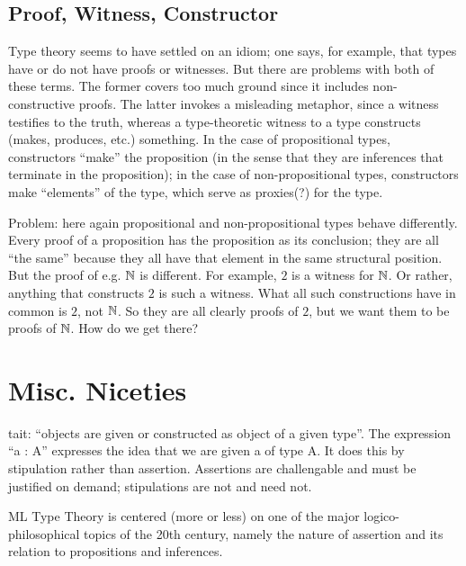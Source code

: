 \subsection{Proof, Witness, Constructor}
\label{subs:pwc}

Type theory seems to have settled on an idiom; one says, for example,
that types have or do not have proofs or witnesses.  But there are
problems with both of these terms.  The former covers too much ground
since it includes non-constructive proofs.  The latter invokes a
misleading metaphor, since a witness testifies to the truth, whereas a
type-theoretic witness to a type constructs (makes, produces, etc.)
something.  In the case of propositional types, constructors ``make''
the proposition (in the sense that they are inferences that terminate
in the proposition); in the case of non-propositional types,
constructors make ``elements'' of the type, which serve as proxies(?) for
the type.

\begin{remark}
  Problem: here again propositional and non-propositional types behave
  differently.  Every proof of a proposition has the proposition as
  its conclusion; they are all ``the same'' because they all have that
  element in the same structural position.  But the proof of
  e.g. \(\mathbb{N}\) is different.  For example, \(2\) is a witness for
  \(\mathbb{N}\).  Or rather, anything that constructs \(2\) is such a
  witness.  What all such constructions have in common is \(2\), not
  \(\mathbb{N}\).  So they are all clearly proofs of \(2\), but we want them
  to be proofs of \(\mathbb{N}\).  How do we get there?
\end{remark}

\section{Misc. Niceties}

\begin{ednote}
  tait: ``objects are given or constructed as object of a given
  type''.  The expression ``a : A'' expresses the idea that we are
  given a of type A.  It does this by stipulation rather than
  assertion.  Assertions are challengable and must be justified on
  demand; stipulations are not and need not.
\end{ednote}

ML Type Theory is centered (more or less) on one of the major
logico-philosophical topics of the 20th century, namely the nature of
assertion and its relation to propositions and inferences.

